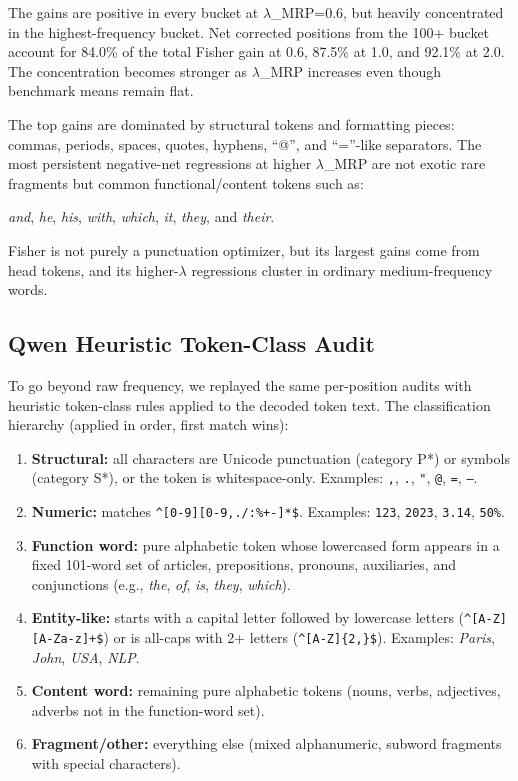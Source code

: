 \documentclass[
  11pt,
]{article}
\providecommand{\tightlist}{%
  \setlength{\itemsep}{0pt}\setlength{\parskip}{0pt}}
\begin{document}
The gains are positive in every bucket at $\lambda$\_MRP=0.6, but heavily
concentrated in the highest-frequency bucket. Net corrected positions
from the 100+ bucket account for 84.0\% of the total Fisher gain at 0.6,
87.5\% at 1.0, and 92.1\% at 2.0. The concentration becomes stronger as
$\lambda$\_MRP increases even though benchmark means remain flat.

The top gains are dominated by structural tokens and formatting pieces:
commas, periods, spaces, quotes, hyphens, ``@'', and ``=''-like
separators. The most persistent negative-net regressions at higher
$\lambda$\_MRP are not exotic rare fragments but common functional/content
tokens such as:

\emph{and}, \emph{he}, \emph{his}, \emph{with}, \emph{which}, \emph{it},
\emph{they}, and \emph{their}.

Fisher is not purely a punctuation optimizer, but its largest gains come
from head tokens, and its higher-$\lambda$ regressions cluster in ordinary
medium-frequency words.

\hypertarget{qwen-heuristic-token-class-audit}{%
\subsection{Qwen Heuristic Token-Class
Audit}\label{qwen-heuristic-token-class-audit}}

To go beyond raw frequency, we replayed the same per-position audits
with heuristic token-class rules applied to the decoded token text. The
classification hierarchy (applied in order, first match wins):

\begin{enumerate}
\def\labelenumi{\arabic{enumi}.}
\tightlist
\item
  \textbf{Structural:} all characters are Unicode punctuation (category
  P*) or symbols (category S*), or the token is whitespace-only.
  Examples: \texttt{,}, \texttt{.}, \texttt{"}, \texttt{@}, \texttt{=},
  \texttt{---}.
\item
  \textbf{Numeric:} matches \texttt{\^{}{[}0-9{]}{[}0-9,./:\%+-{]}*\$}.
  Examples: \texttt{123}, \texttt{2023}, \texttt{3.14}, \texttt{50\%}.
\item
  \textbf{Function word:} pure alphabetic token whose lowercased form
  appears in a fixed 101-word set of articles, prepositions, pronouns,
  auxiliaries, and conjunctions (e.g., \emph{the}, \emph{of}, \emph{is},
  \emph{they}, \emph{which}).
\item
  \textbf{Entity-like:} starts with a capital letter followed by
  lowercase letters (\texttt{\^{}{[}A-Z{]}{[}A-Za-z{]}+\$}) or is
  all-caps with 2+ letters (\texttt{\^{}{[}A-Z{]}\{2,\}\$}). Examples:
  \emph{Paris}, \emph{John}, \emph{USA}, \emph{NLP}.
\item
  \textbf{Content word:} remaining pure alphabetic tokens (nouns, verbs,
  adjectives, adverbs not in the function-word set).
\item
  \textbf{Fragment/other:} everything else (mixed alphanumeric, subword
  fragments with special characters).
\end{enumerate}
\end{document}
